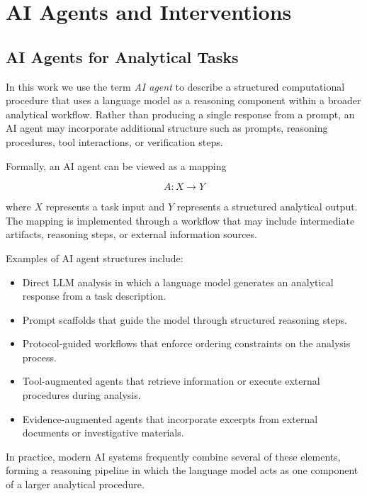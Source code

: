 \section{AI Agents and Interventions}

\subsection{AI Agents for Analytical Tasks}

In this work we use the term \emph{AI agent} to describe a structured
computational procedure that uses a language model as a reasoning component
within a broader analytical workflow. Rather than producing a single
response from a prompt, an AI agent may incorporate additional structure
such as prompts, reasoning procedures, tool interactions, or verification
steps.

Formally, an AI agent can be viewed as a mapping

\[
A : X \rightarrow Y
\]

where \(X\) represents a task input and \(Y\) represents a structured
analytical output. The mapping is implemented through a workflow that may
include intermediate artifacts, reasoning steps, or external information
sources.

Examples of AI agent structures include:

\begin{itemize}

\item Direct LLM analysis in which a language model generates an analytical
response from a task description.

\item Prompt scaffolds that guide the model through structured reasoning
steps.

\item Protocol-guided workflows that enforce ordering constraints on the
analysis process.

\item Tool-augmented agents that retrieve information or execute external
procedures during analysis.

\item Evidence-augmented agents that incorporate excerpts from external
documents or investigative materials.

\end{itemize}

In practice, modern AI systems frequently combine several of these elements,
forming a reasoning pipeline in which the language model acts as one
component of a larger analytical procedure.

